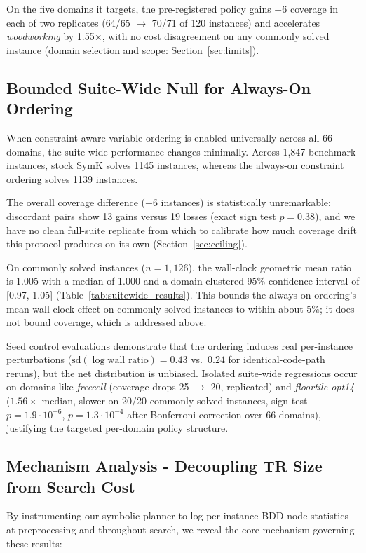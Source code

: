 \documentclass[twocolumn,10pt]{article}
\begin{document}
\begin{funfact}
On the five domains it targets, the pre-registered policy gains $+6$ coverage in each of two replicates (64/65 $\to$ 70/71 of 120 instances) and accelerates \textit{woodworking} by 1.55$\times$, with no cost disagreement on any commonly solved instance (domain selection and scope: Section~\ref{sec:limits}).
\end{funfact}

\subsection{Bounded Suite-Wide Null for Always-On Ordering}
When constraint-aware variable ordering is enabled universally across all 66 domains, the suite-wide performance changes minimally. Across 1,847 benchmark instances, stock \textsf{SymK} solves 1145 instances, whereas the always-on constraint ordering solves 1139 instances.

The overall coverage difference ($-6$ instances) is statistically unremarkable: discordant pairs show 13 gains versus 19 losses (exact sign test $p = 0.38$), and we have no clean full-suite replicate from which to calibrate how much coverage drift this protocol produces on its own (Section~\ref{sec:ceiling}).

On commonly solved instances ($n = 1{,}126$), the wall-clock geometric mean ratio is 1.005 with a median of 1.000 and a domain-clustered 95\% confidence interval of [0.97, 1.05] (Table~\ref{tab:suitewide_results}). This bounds the always-on ordering's mean wall-clock effect on commonly solved instances to within about 5\%; it does not bound coverage, which is addressed above.

Seed control evaluations demonstrate that the ordering induces real per-instance perturbations ($\text{sd}(\log \text{wall ratio}) = 0.43$ vs.\ $0.24$ for identical-code-path reruns), but the net distribution is unbiased. Isolated suite-wide regressions occur on domains like \textit{freecell} (coverage drops 25 $\to$ 20, replicated) and \textit{floortile-opt14} ($1.56\times$ median, slower on 20/20 commonly solved instances, sign test $p = 1.9 \cdot 10^{-6}$, $p = 1.3 \cdot 10^{-4}$ after Bonferroni correction over 66 domains), justifying the targeted per-domain policy structure.

\subsection{Mechanism Analysis - Decoupling TR Size from Search Cost}
\label{sec:mech}
By instrumenting our symbolic planner to log per-instance BDD node statistics at preprocessing and throughout search, we reveal the core mechanism governing these results:
\end{document}

